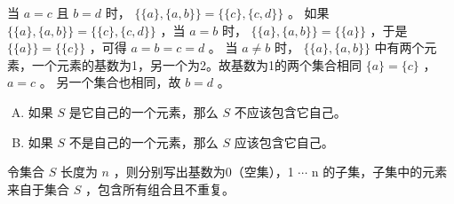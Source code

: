 {{        %
        \begin{practices}
            当 $a = c$ 且 $b = d$ 时， $\{\{a\}, \{a, b\}\} = \{\{c\}, \{c, d\}\}$ 。
            如果 $\{\{a\}, \{a, b\}\} = \{\{c\}, \{c, d\}\}$ ，当 $a = b$ 时， $\{\{a\}, \{a, b\}\} = \{\{a\}\}$ ，于是 $\{\{a\}\} = \{\{c\}\}$ ，可得 $a = b = c = d$ 。
            当 $a \neq b$ 时， $\{\{a\}, \{a, b\}\}$ 中有两个元素，一个元素的基数为1，另一个为2。故基数为1的两个集合相同 $\{a\} = \{c\}$ ， $a = c$ 。
            另一个集合也相同，故 $b = d$ 。
        \end{practices}

        \begin{practices}
            \begin{enumerate}[A.]
                \item 如果 $S$ 是它自己的一个元素，那么 $S$ 不应该包含它自己。
                \item 如果 $S$ 不是自己的一个元素，那么 $S$ 应该包含它自己。
            \end{enumerate}
        \end{practices}

        \begin{practices}
            令集合 $S$ 长度为 $n$ ，则分别写出基数为0（空集），1 $\cdots$ n 的子集，子集中的元素来自于集合 $S$ ，包含所有组合且不重复。
        \end{practices}
    }
}
